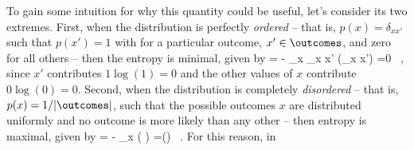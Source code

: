 To gain some intuition for why this quantity could be useful, let's consider its two extremes. First, when the distribution is perfectly \emph{ordered} -- that is, $p(x)=\delta_{xx'}$ such that $p(x')=1$ with  for a particular outcome, $x'\in \outcomes$, and zero for all others 
-- then the entropy is minimal, given by 
\be\label{eq:entropy-minimal}
\entropy\!\le[p(x)\ri]
= - \sum_{x \in \outcomes} \delta_{x x'} \log \!\le(\delta_{x x'}\ri)
=0 \, ,
\ee 
since $x'$ contributes $1 \log(1)=0$ and the other values of $x$ contribute $0\log(0)=0$.
Second, when the distribution is completely \emph{disordered} -- that is,  $p(x)=1/\vert\outcomes\vert$, such that the possible outcomes $x$ are distributed uniformly and no outcome is more likely than any other -- then entropy is
maximal, given by
\be\label{eq:entropy-maximal}
\entropy\!\le[p(x)\ri]
= - \sum_{x \in \outcomes}  \log \!\le( \ri)
=\log(\vert\outcomes\vert) \, .
\ee
For this reason, in 

